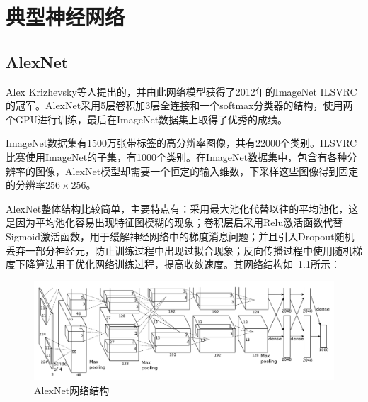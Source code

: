 
\chapter{典型神经网络}

\section{AlexNet}
Alex Krizhevsky等人\cite{hinton2012imagenet}提出的，并由此网络模型获得了2012年的ImageNet ILSVRC的冠军。AlexNet采用5层卷积加3层全连接和一个softmax分类器的结构，使用两个GPU进行训练，最后在ImageNet数据集上取得了优秀的成绩。

ImageNet数据集有1500万张带标签的高分辨率图像，共有22000个类别。ILSVRC比赛使用ImageNet的子集，有1000个类别。在ImageNet数据集中，包含有各种分辨率的图像，AlexNet模型却需要一个恒定的输入维数，下采样这些图像得到固定的分辨率$256\times256$。

AlexNet整体结构比较简单，主要特点有：采用最大池化代替以往的平均池化，这是因为平均池化容易出现特征图模糊的现象；卷积层后采用Relu激活函数代替Sigmoid激活函数，用于缓解神经网络中的梯度消息问题；并且引入Dropout随机丢弃一部分神经元，防止训练过程中出现过拟合现象；反向传播过程中使用随机梯度下降算法用于优化网络训练过程，提高收敛速度。其网络结构如~\ref{fig:AlexNet_net}所示：
\begin{figure}[h!]
	\centering
	\includegraphics[width=\linewidth]{readings_figures/AlexNet_net.png}
	\caption{AlexNet网络结构}
	\label{fig:AlexNet_net}
\end{figure}

